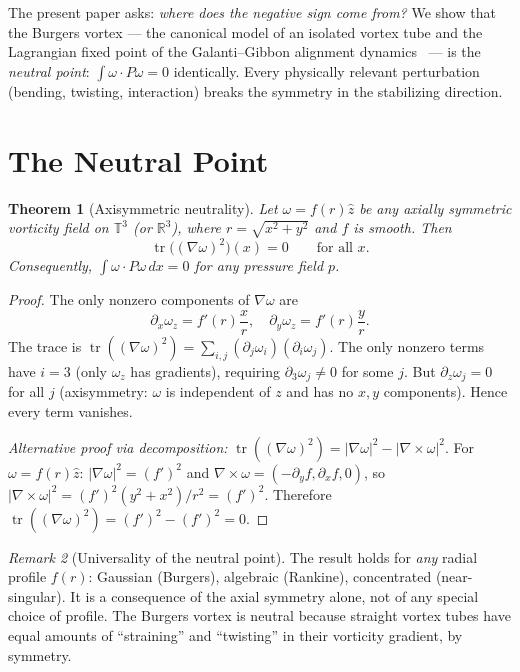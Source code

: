 \documentclass[11pt,a4paper]{article}
\theoremstyle{plain}
\newtheorem{theorem}{Theorem}[section]
\theoremstyle{definition}
\theoremstyle{remark}
\newtheorem{remark}[theorem]{Remark}
\newcommand{\R}{\mathbb{R}}
\newcommand{\T}{\mathbb{T}}
\DeclareMathOperator{\tr}{tr}
\begin{document}
The present paper asks: \emph{where does the
negative sign come from?}  We show that the Burgers
vortex --- the canonical model of an isolated vortex
tube and the Lagrangian fixed point of the
Galanti--Gibbon alignment
dynamics~\cite{GalantiGibbon97} --- is the
\emph{neutral point}: $\int\omega\cdot P\omega=0$
identically.  Every physically relevant perturbation
(bending, twisting, interaction) breaks the symmetry
in the stabilizing direction.


\section{The Neutral Point}\label{sec:neutral}

\begin{theorem}[Axisymmetric neutrality]
\label{thm:axisym}
Let $\omega=f(r)\hat z$ be any axially symmetric
vorticity field on $\T^3$ (or $\R^3$), where
$r=\sqrt{x^2+y^2}$ and $f$ is smooth.  Then
\begin{equation}\label{eq:tr-zero}
\tr\bigl((\nabla\omega)^2\bigr)(x) = 0
\qquad\text{for all } x.
\end{equation}
Consequently, $\int\omega\cdot P\omega\,dx = 0$
for any pressure field $p$.
\end{theorem}

\begin{proof}
The only nonzero components of $\nabla\omega$ are
\[
\partial_x\omega_z = f'(r)\frac{x}{r},\quad
\partial_y\omega_z = f'(r)\frac{y}{r}.
\]
The trace is
$\tr((\nabla\omega)^2) = \sum_{i,j}
(\partial_j\omega_i)(\partial_i\omega_j)$.
The only nonzero terms have $i=3$ (only $\omega_z$
has gradients), requiring $\partial_3\omega_j\neq 0$
for some $j$.  But $\partial_z\omega_j=0$ for all
$j$ (axisymmetry: $\omega$ is independent of $z$
and has no $x,y$ components).  Hence every term
vanishes.

\emph{Alternative proof via decomposition:}
$\tr((\nabla\omega)^2) = |\nabla\omega|^2
- |\nabla\times\omega|^2$.
For $\omega=f(r)\hat z$:
$|\nabla\omega|^2 = (f')^2$
and $\nabla\times\omega = (-\partial_y f,
\partial_x f, 0)$, so
$|\nabla\times\omega|^2 = (f')^2(y^2+x^2)/r^2
= (f')^2$.  Therefore
$\tr((\nabla\omega)^2) = (f')^2-(f')^2 = 0$.
\end{proof}

\begin{remark}[Universality of the neutral point]
\label{rem:universal}
The result holds for \emph{any} radial profile $f(r)$:
Gaussian (Burgers), algebraic (Rankine),
concentrated (near-singular).
It is a consequence of the axial symmetry alone,
not of any special choice of profile.  The Burgers
vortex is neutral because straight vortex tubes have
equal amounts of ``straining'' and ``twisting'' in
their vorticity gradient, by symmetry.
\end{remark}
\end{document}
